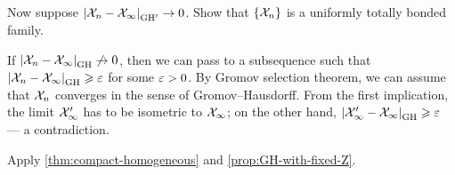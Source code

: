 Now suppose $\dist{\spc{X}_n}{\spc{X}_\infty}{\GH'}\to 0$.
Show that $\{\mathcal{X}_n\}$ is a uniformly totally bonded family.

If $\dist{\spc{X}_n}{\spc{X}_\infty}{\GH}\not\to 0$, then we can pass to a subsequence such that $\dist{\spc{X}_n}{\spc{X}_\infty}{\GH}\ge\eps$ for some $\varepsilon>0$.
By Gromov selection theorem, we can assume that $\mathcal{X}_n$ converges in the sense of Gromov--Hausdorff.
From the first implication, the limit $\mathcal{X}_\infty'$ has to be isometric to $\mathcal{X}_\infty$;
on the other hand, $\dist{\spc{X}_\infty'}{\spc{X}_\infty}{\GH}\ge \eps$ --- a contradiction.

Apply \ref{thm:compact-homogeneous} and \ref{prop:GH-with-fixed-Z}.

